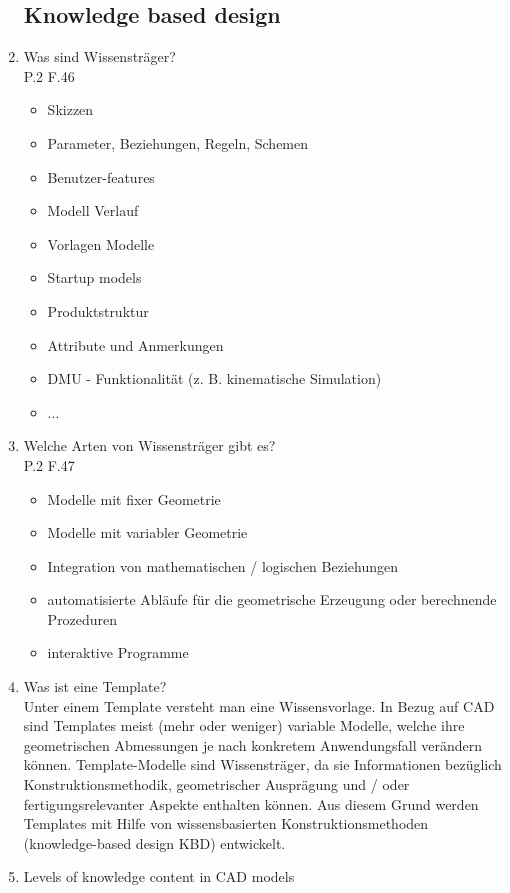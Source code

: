 \documentclass[10pt,a4paper,fleqn]{article}
\begin{document}
\begin{enumerate}
\subsection{Knowledge based design}
	\item Was sind Wissensträger?\\
		P.2 F.46
		\begin{itemize}
			\item Skizzen
			\item Parameter, Beziehungen, Regeln, Schemen
			\item Benutzer-features
			\item Modell Verlauf
			\item Vorlagen Modelle
			\item Startup models
			\item Produktstruktur
			\item Attribute und Anmerkungen
			\item DMU - Funktionalität (z. B. kinematische Simulation)
			\item $\dots$
		\end{itemize}
	\item Welche Arten von Wissensträger gibt es?\\
		P.2 F.47
		\begin{itemize}
			\item Modelle mit fixer Geometrie
			\item Modelle mit variabler Geometrie
			\item Integration von mathematischen / logischen Beziehungen
			\item automatisierte Abläufe für die geometrische Erzeugung oder berechnende Prozeduren
			\item interaktive Programme
		\end{itemize}
	\item Was ist eine Template?\\
		Unter einem Template versteht man eine Wissensvorlage. In Bezug auf CAD sind Templates meist (mehr oder weniger) variable Modelle, welche ihre geometrischen Abmessungen je nach konkretem Anwendungsfall verändern können. Template-Modelle sind Wissensträger, da sie Informationen bezüglich Konstruktionsmethodik, geometrischer Ausprägung und / oder fertigungsrelevanter Aspekte enthalten können. Aus diesem Grund werden Templates mit Hilfe von wissensbasierten Konstruktionsmethoden (knowledge-based design KBD) entwickelt. 
	\item Levels of knowledge content in CAD models\\

\end{enumerate}
\end{document}
